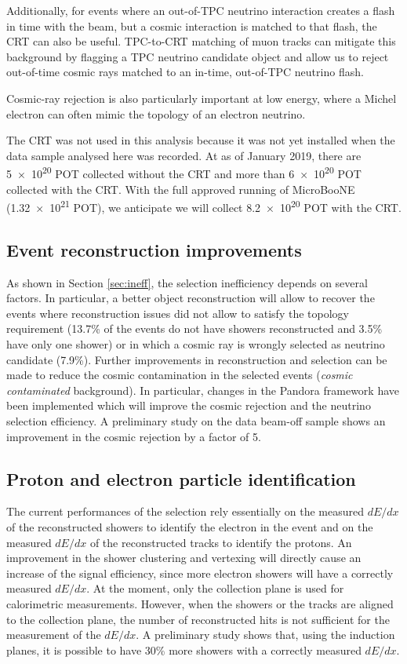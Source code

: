 Additionally, for events where an out-of-TPC neutrino interaction creates a flash in time with the beam, but a cosmic interaction is matched to that flash, the CRT can also be useful.  TPC-to-CRT matching of muon tracks can mitigate this background by flagging a TPC neutrino candidate object and allow us to reject out-of-time cosmic rays matched to an in-time, out-of-TPC neutrino flash.

Cosmic-ray rejection is also particularly important at low energy, where a Michel electron can often mimic the topology of an electron neutrino. 

The CRT was not used in this analysis because it was not yet installed when the data sample analysed here was recorded. At as of January 2019, there are \num{5e20} POT collected without the CRT and more than \num{6e20} POT collected with the CRT. With the full approved running of MicroBooNE (\num{1.32e21} POT), we anticipate we will collect \num{8.2e20} POT with the CRT.

\subsection*{Event reconstruction improvements}
As shown in Section \ref{sec:ineff}, the selection inefficiency depends on several factors. In particular, a better object reconstruction will allow to recover the events where reconstruction issues did not allow to satisfy the topology requirement (13.7\% of the events do not have showers reconstructed and 3.5\% have only one shower) or in which a cosmic ray is wrongly selected as neutrino candidate (7.9\%). 
Further improvements in reconstruction and selection can be made to reduce the cosmic contamination in the selected events (\emph{cosmic contaminated} background).
In particular, changes in the Pandora framework have been implemented which will improve the cosmic rejection and the neutrino selection efficiency. A preliminary study on the data beam-off sample shows an improvement in the cosmic rejection by a factor of 5.

\subsection*{Proton and electron particle identification}
The current performances of the selection rely essentially on the measured $dE/dx$ of the reconstructed showers to identify the electron in the event and on the measured $dE/dx$ of the reconstructed tracks to identify the protons. An improvement in the shower clustering and vertexing will directly cause an increase of the signal efficiency, since more electron showers will have a correctly measured $dE/dx$. 
At the moment, only the collection plane is used for calorimetric measurements. However, when the showers or the tracks are aligned to the collection plane, the number of reconstructed hits is not sufficient for the measurement of the $dE/dx$. A preliminary study shows that, using the induction planes, it is possible to have 30\% more showers with a correctly measured $dE/dx$.

